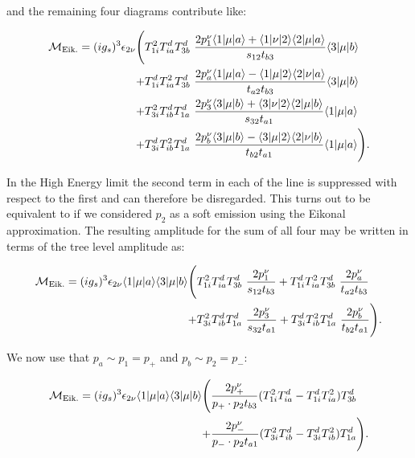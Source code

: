	and the remaining four diagrams contribute like:

	\begin{align}
	\begin{split}
	    \mathcal{M}_{\text{Eik.}} = (ig_s)^3 \epsilon_{2\nu} \Bigg(
	     &T^2_{1i}T^d_{ia}T^d_{3b}\ \frac{2p_1^\nu\langle 1 | \mu | a \rangle + \langle 1 | \nu | 2 \rangle\langle 2 | \mu | a \rangle} {s_{12}t_{b3}} \langle 3 | \mu | b \rangle \\
	    +&T^d_{1i}T^2_{ia}T^d_{3b}\ \frac{2p_a^\nu\langle 1 | \mu | a \rangle - \langle 1 | \mu | 2 \rangle\langle 2 | \nu | a \rangle} {t_{a2}t_{b3}} \langle 3 | \mu | b \rangle \\
	    +&T^2_{3i}T^d_{ib}T^d_{1a}\ \frac{2p_3^\nu\langle 3 | \mu | b \rangle + \langle 3 | \nu | 2 \rangle\langle 2 | \mu | b \rangle} {s_{32}t_{a1}} \langle 1 | \mu | a \rangle\\
	    +&T^d_{3i}T^2_{ib}T^d_{1a}\ \frac{2p_b^\nu\langle 3 | \mu | b \rangle - \langle 3 | \mu | 2 \rangle\langle 2 | \nu | b \rangle} {t_{b2}t_{a1}} \langle 1 | \mu | a \rangle\Bigg).
		\label{eq:fulltree}
	\end{split}
	\end{align}

	In the High Energy limit the second term in each of the line is suppressed with respect to the
	first and can therefore be disregarded.  This turns out to be equivalent to if we considered
	$p_2$ as a soft emission using the Eikonal approximation.  The resulting amplitude for the sum
	of all four may be written in terms of the tree level amplitude as:

	\begin{align}
	\begin{split}
	    \mathcal{M}_{\text{Eik.}} = (ig_s)^3 \epsilon_{2\nu} \langle 1 | \mu | a \rangle \langle 3 | \mu | b \rangle \Bigg(
	     &T^2_{1i}T^d_{ia}T^d_{3b}\ \frac{2p_1^\nu}{s_{12}t_{b3}}
	    + T^d_{1i}T^2_{ia}T^d_{3b}\ \frac{2p_a^\nu}{t_{a2}t_{b3}} \\
	    +&T^2_{3i}T^d_{ib}T^d_{1a}\ \frac{2p_3^\nu}{s_{32}t_{a1}}
	    + T^d_{3i}T^2_{ib}T^d_{1a}\ \frac{2p_b^\nu}{t_{b2}t_{a1}}\Bigg).
		\label{eq:fulltree2}
	\end{split}
	\end{align}

	We now use that $p_a\sim p_1=p_+$ and $p_b\sim p_2=p_-$:

	\begin{align}
	\begin{split}
		\mathcal{M}_{\text{Eik.}} = (ig_s)^3 \epsilon_{2\nu} \langle 1 | \mu | a \rangle \langle 3 | \mu | b \rangle \Bigg(&
		\frac{2p_+^\nu}{p_+\cdot p_2 t_{b3}}(T^2_{1i}T^d_{ia} - T^d_{1i}T^2_{ia})T^d_{3b}\\
		+ &\frac{2p_-^\nu}{p_-\cdot p_2 t_{a1}}(T^2_{3i}T^d_{ib} - T^d_{3i}T^2_{ib})T^d_{1a}\Bigg).\\
	\end{split}
	\end{align}

